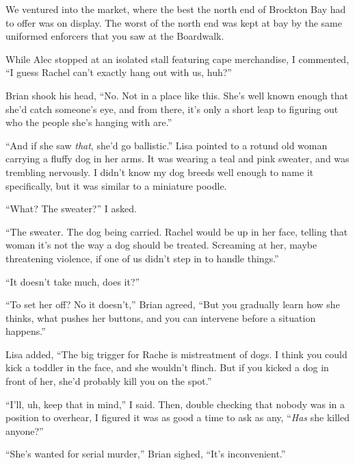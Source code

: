 We ventured into the market, where the best the north end of Brockton Bay had to offer was on display.  The worst of the north end was kept at bay by the same uniformed enforcers that you saw at the Boardwalk.



While Alec stopped at an isolated stall featuring cape merchandise, I commented, ``I guess Rachel can't exactly hang out with us, huh?''



Brian shook his head, ``No.  Not in a place like this.  She's well known enough that she'd catch someone's eye, and from there, it's only a short leap to figuring out who the people she's hanging with are.''



``And if she saw \emph{that}, she'd go ballistic.''  Lisa pointed to a rotund old woman carrying a fluffy dog in her arms.   It was wearing a teal and pink sweater, and was trembling nervously.  I didn't know my dog breeds well enough to name it specifically, but it was similar to a miniature poodle.



``What?  The sweater?'' I asked.



``The sweater.  The dog being carried.  Rachel would be up in her face, telling that woman it's not the way a dog should be treated.  Screaming at her, maybe threatening violence, if one of us didn't step in to handle things.''



``It doesn't take much, does it?''



``To set her off?  No it doesn't,'' Brian agreed, ``But you gradually learn how she thinks, what pushes her buttons, and you can intervene before a situation happens.''



Lisa added, ``The big trigger for Rache is mistreatment of dogs.  I think you could kick a toddler in the face, and she wouldn't flinch.  But if you kicked a dog in front of her, she'd probably kill you on the spot.''



``I'll, uh, keep that in mind,'' I said.  Then, double checking that nobody was in a position to overhear, I figured it was as good a time to ask as any, ``\emph{Has} she killed anyone?''



``She's wanted for serial murder,'' Brian sighed, ``It's inconvenient.''



